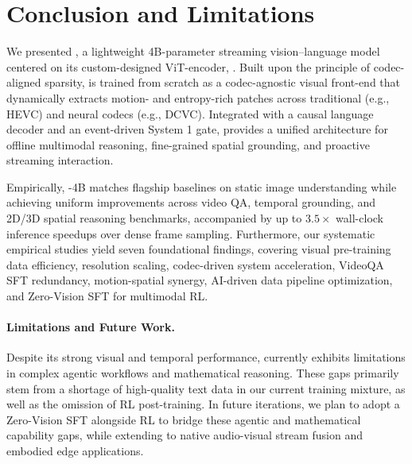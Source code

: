\section{Conclusion and Limitations}
\label{sec:conclusion}
We presented \magevl, a lightweight 4B-parameter streaming vision--language model centered on its custom-designed ViT-encoder, \magevit. Built upon the principle of codec-aligned sparsity, \magevit is trained from scratch as a codec-agnostic visual front-end that dynamically extracts motion- and entropy-rich patches across traditional (e.g., HEVC) and neural codecs (e.g., DCVC). Integrated with a causal language decoder and an event-driven System 1 gate, \magevl provides a unified architecture for offline multimodal reasoning, fine-grained spatial grounding, and proactive streaming interaction.

Empirically, \magevl-4B matches flagship baselines on static image understanding while achieving uniform improvements across video QA, temporal grounding, and 2D/3D spatial reasoning benchmarks, accompanied by up to $3.5\times$ wall-clock inference speedups over dense frame sampling. Furthermore, our systematic empirical studies yield seven foundational findings, covering visual pre-training data efficiency, resolution scaling, codec-driven system acceleration, VideoQA SFT redundancy, motion-spatial synergy, AI-driven data pipeline optimization, and Zero-Vision SFT for multimodal RL.



\paragraph{Limitations and Future Work.}
Despite its strong visual and temporal performance, \magevl currently exhibits limitations in complex agentic workflows and mathematical reasoning. These gaps primarily stem from a shortage of high-quality text data in our current training mixture, as well as the omission of RL post-training. In future iterations, we plan to adopt a Zero-Vision SFT alongside RL to bridge these agentic and mathematical capability gaps, while extending \magevl to native audio-visual stream fusion and embodied edge applications.


